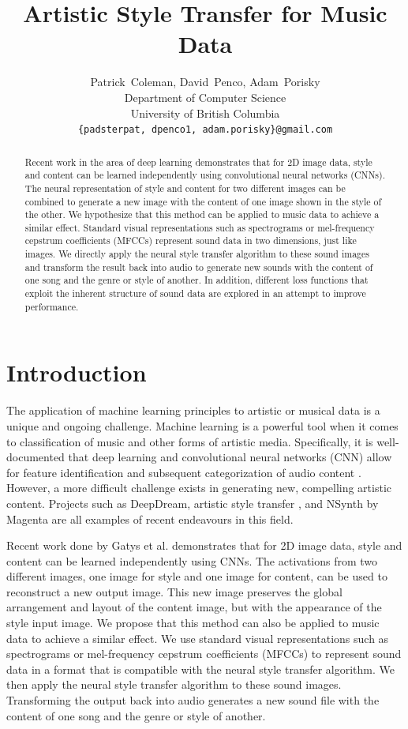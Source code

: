 \documentclass{article}
\title{Artistic Style Transfer for Music Data}
\author{
  Patrick~Coleman, David~Penco, Adam~Porisky \\
  Department of Computer Science\\
  University of British Columbia\\
  \texttt{\{padsterpat, dpenco1, adam.porisky\}@gmail.com} \\
}
\begin{document}


\maketitle

\begin{abstract}
  Recent work in the area of deep learning demonstrates that for 2D image data, style and content can be learned independently using convolutional neural networks (CNNs). The neural representation of style and content for two different images can be combined to generate a new image with the content of one image shown in the style of the other. We hypothesize that this method can be applied to music data to achieve a similar effect. Standard visual representations such as spectrograms or mel-frequency cepstrum coefficients (MFCCs) represent sound data in two dimensions, just like images. We directly apply the neural style transfer algorithm to these sound images and transform the result back into audio to generate new sounds with the content of one song and the genre or style of another. In addition, different loss functions that exploit the inherent structure of sound data are explored in an attempt to improve performance. 
\end{abstract}

\section{Introduction}

The application of machine learning principles to artistic or musical data is a unique and ongoing challenge. Machine learning is a powerful tool when it comes to classification of music and other forms of artistic media. Specifically, it is well-documented that deep learning and convolutional neural networks (CNN) allow for feature identification and subsequent categorization of audio content \citep{feng2014, Li2010}. However, a more difficult challenge exists in generating new, compelling artistic content. Projects such as DeepDream, artistic style transfer \citep{Gatys2015}, and NSynth by Magenta \citep{nsynth2017} are all examples of recent endeavours in this field.

Recent work done by Gatys et al. \citep{Gatys2015} demonstrates that for 2D image data, style and content can be learned independently using CNNs. The activations from two different images, one image for style and one image for content, can be used to reconstruct a new output image. This new image preserves the global arrangement and layout of the content image, but with the appearance of the style input image. We propose that this method can also be applied to music data to achieve a similar effect. We use standard visual representations such as spectrograms or mel-frequency cepstrum coefficients (MFCCs) to represent sound data in a format that is compatible with the neural style transfer algorithm. We then apply the neural style transfer algorithm to these sound images. Transforming the output back into audio generates a new sound file with the content of one song and the genre or style of another.
\end{document}
